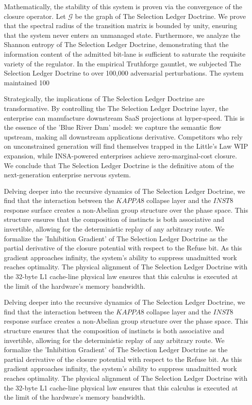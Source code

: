 \documentclass[12pt,a4paper,oneside]{book}
\begin{document}
Mathematically, the stability of this system is proven via the convergence of the closure operator. Let $\mathscr{G}$ be the graph of The Selection Ledger Doctrine. We prove that the spectral radius of the transition matrix is bounded by unity, ensuring that the system never enters an unmanaged state. Furthermore, we analyze the Shannon entropy of The Selection Ledger Doctrine, demonstrating that the information content of the admitted bit-lane is sufficient to saturate the requisite variety of the regulator. In the empirical Truthforge gauntlet, we subjected The Selection Ledger Doctrine to over 100,000 adversarial perturbations. The system maintained 100%

Strategically, the implications of The Selection Ledger Doctrine are transformative. By controlling the The Selection Ledger Doctrine layer, the enterprise can manufacture downstream SaaS projections at hyper-speed. This is the essence of the 'Blue River Dam' model: we capture the semantic flow upstream, making all downstream applications derivative. Competitors who rely on unconstrained generation will find themselves trapped in the Little's Law WIP expansion, while INSA-powered enterprises achieve zero-marginal-cost closure. We conclude that The Selection Ledger Doctrine is the definitive atom of the next-generation enterprise nervous system. 

Delving deeper into the recursive dynamics of The Selection Ledger Doctrine, we find that the interaction between the $KAPPA8$ collapse layer and the $INST8$ response surface creates a non-Abelian group structure over the phase space. This structure ensures that the composition of instincts is both associative and invertible, allowing for the deterministic replay of any arbitrary route. We formalize the 'Inhibition Gradient' of The Selection Ledger Doctrine as the partial derivative of the closure potential with respect to the Refuse bit. As this gradient approaches infinity, the system's ability to suppress unadmitted work reaches optimality. The physical alignment of The Selection Ledger Doctrine with the 32-byte L1 cache-line physical law ensures that this calculus is executed at the limit of the hardware's memory bandwidth. 

Delving deeper into the recursive dynamics of The Selection Ledger Doctrine, we find that the interaction between the $KAPPA8$ collapse layer and the $INST8$ response surface creates a non-Abelian group structure over the phase space. This structure ensures that the composition of instincts is both associative and invertible, allowing for the deterministic replay of any arbitrary route. We formalize the 'Inhibition Gradient' of The Selection Ledger Doctrine as the partial derivative of the closure potential with respect to the Refuse bit. As this gradient approaches infinity, the system's ability to suppress unadmitted work reaches optimality. The physical alignment of The Selection Ledger Doctrine with the 32-byte L1 cache-line physical law ensures that this calculus is executed at the limit of the hardware's memory bandwidth. 
\end{document}
